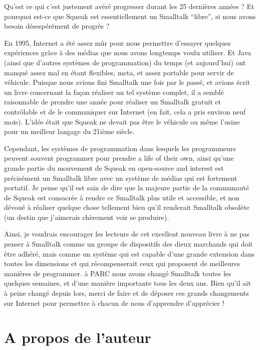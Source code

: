 \documentclass[a4paper,10pt,twoside]{book}
\begin{document}
Qu'est ce qui c'est justement av\'er\'e progresser durant les  25 derni\`eres ann\'ees ? Et pourquoi est-ce que Squeak est essentiellement un Smalltalk ``libre'', si nous avons besoin d\'esesp\'er\'ement de progr\`es ?

En 1995, Internet a \'et\'e assez m\^ur pour nous permettre d'essayer quelques exp\'eriences gr\^ace \`a des m\'edias que nous avons longtemps voulu utiliser. Et Java (ainsi que d'autres syst\`emes de programmation) du temps (et aujourd'hui) ont manqu\'e assez mal en \'etant flexibles, meta, et  assez portable pour servir de v\'ehicule. Puisque nous avions fini Smalltalk une fois par le pass\'e, et avions \'ecrit un livre concernant la fa\c con r\'ealiser un tel syst\`eme complet, il a sembl\'e  raisonnable de prendre une ann\'ee pour r\'ealiser un Smalltalk gratuit et contr\^olable et de le communiquer sur Internet (en fait, cela a pris environ neuf mois). L'id\'ee \'etait que Squeak ne devait pas \^etre le v\'ehicule ou m\^eme l'usine pour un meilleur langage du 21i\`eme si\`ecle.


Cependant, les syst\`emes de programmation dans lesquels les programmeurs peuvent souvent programmer pour prendre a life of their own, ainsi qu'une grande partie du mouvement de Squeak en open-source and interest est pr\'ecis\'ement un Smalltalk libre avec un syst\`eme de m\'edias qui est fortement portatif. Je pense qu'il est sain de dire que la majeure partie de la communaut\'e de Squeak est consacr\'ee \`a rendre ce Smalltalk plus utile et accessible, et non d\'evou\'e \`a r\'ealiser quelque chose tellement bien qu'il renderait Smalltalk obsol\`ete (un destin que j'aimerais ch\`erement voir se produire).


Ainsi, je voudrais encourager les lecteurs de cet excellent nouveau livre \`a ne pas penser \`a Smalltalk comme un groupe de dispositifs des dieux marchands   qui doit \^etre adh\'er\'e, mais comme un syst\`eme qui est capable d'une grande extension dans toutes les dimensions et qui r\'ecompenserait ceux qui proposent de meilleures mani\`eres de programmer. \`a PARC nous avons chang\'e Smalltalk toutes les quelques semaines, et d'une mani\`ere importante tous les deux ans. Bien qu'il ait \`a peine chang\'e depuis lors, merci de faire et de d\'eposer ces grands changements sur Internet pour permettre \`a chacun de nous d'apprendre d'appr\'ecier !

\chapter*{A propos de  l'auteur}
\end{document}
